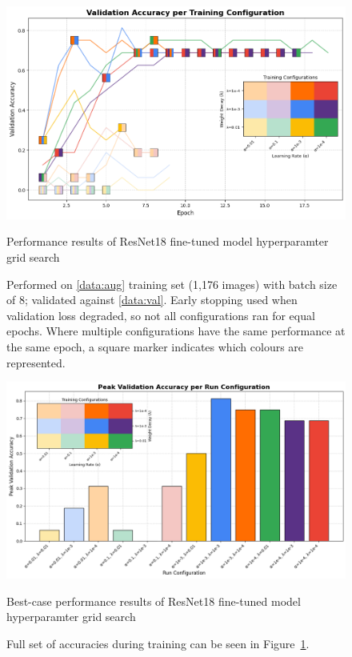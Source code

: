                         \begin{figure}[h]
                            \centering
                            \includegraphics[width=\textwidth]{images/ResNetCNN_AugGrid.png}
                            \caption{Performance results of ResNet18 fine-tuned model hyperparamter grid search}
                            \caption*{Performed on \ref{data:aug} training set (1,176 images) with batch size of 8; validated against \ref{data:val}. Early stopping used when validation loss degraded, so not all configurations ran for equal epochs. Where multiple configurations have the same performance at the same epoch, a square marker indicates which colours are represented.}
                            \label{fig:ResNet_AugGrid}
                        \end{figure}
                
                        \begin{figure}[h]
                            \centering
                            \includegraphics[width=\textwidth]{images/ResNetCNN_AugGridHist.png}
                            \caption{Best-case performance results of ResNet18 fine-tuned model hyperparamter grid search}
                            \caption*{
                                Full set of accuracies during training can be seen in Figure~\ref{fig:ResNet_AugGrid}.
                            }
                            \label{fig:ResNet_AugGridHist}
                        \end{figure}
        
